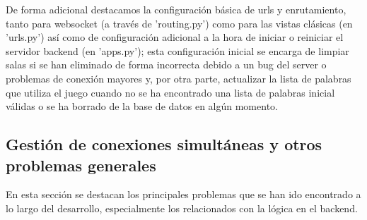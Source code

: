 De forma adicional destacamos la configuración básica de urls y enrutamiento, tanto para websocket (a través de 'routing.py') como para las vistas clásicas (en 'urls.py') así como de 
configuración adicional a la hora de iniciar o reiniciar el servidor backend (en 'apps.py'); esta configuración inicial se encarga de limpiar salas si se han eliminado 
de forma incorrecta debido a un bug del server o problemas de conexión mayores y, por otra parte, actualizar la lista de palabras que utiliza el juego cuando no se ha encontrado
una lista de palabras inicial válidas o se ha borrado de la base de datos en algún momento.


\subsection{Gestión de conexiones simultáneas y otros problemas generales}

En esta sección se destacan los principales problemas que se han ido encontrado a lo largo del desarrollo, especialmente los relacionados con 
la lógica en el backend.


